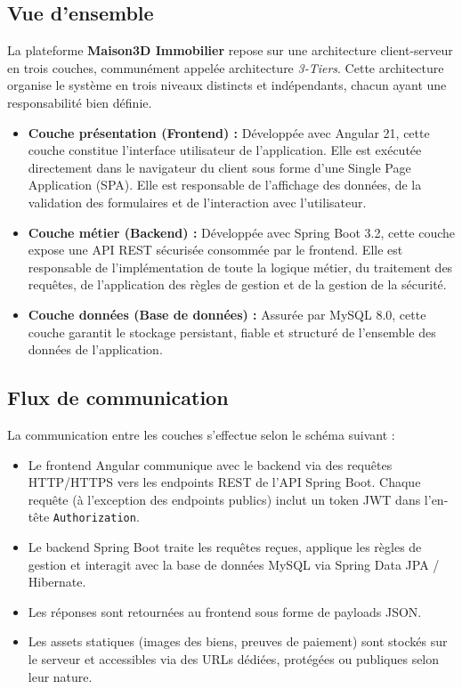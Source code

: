 \documentclass[a4paper,12pt]{report}
\begin{document}
\subsection{Vue d'ensemble}

La plateforme \textbf{Maison3D Immobilier} repose sur une architecture client-serveur en trois couches, communément appelée architecture \textit{3-Tiers}. Cette architecture organise le système en trois niveaux distincts et indépendants, chacun ayant une responsabilité bien définie.

\begin{itemize}
    \item \textbf{Couche présentation (Frontend) :} Développée avec Angular 21, cette couche constitue l'interface utilisateur de l'application. Elle est exécutée directement dans le navigateur du client sous forme d'une Single Page Application (SPA). Elle est responsable de l'affichage des données, de la validation des formulaires et de l'interaction avec l'utilisateur.
    \item \textbf{Couche métier (Backend) :} Développée avec Spring Boot 3.2, cette couche expose une API REST sécurisée consommée par le frontend. Elle est responsable de l'implémentation de toute la logique métier, du traitement des requêtes, de l'application des règles de gestion et de la gestion de la sécurité.
    \item \textbf{Couche données (Base de données) :} Assurée par MySQL 8.0, cette couche garantit le stockage persistant, fiable et structuré de l'ensemble des données de l'application.
\end{itemize}

\subsection{Flux de communication}

La communication entre les couches s'effectue selon le schéma suivant :

\begin{itemize}
    \item Le frontend Angular communique avec le backend via des requêtes HTTP/HTTPS vers les endpoints REST de l'API Spring Boot. Chaque requête (à l'exception des endpoints publics) inclut un token JWT dans l'en-tête \texttt{Authorization}.
    \item Le backend Spring Boot traite les requêtes reçues, applique les règles de gestion et interagit avec la base de données MySQL via Spring Data JPA / Hibernate.
    \item Les réponses sont retournées au frontend sous forme de payloads JSON.
    \item Les assets statiques (images des biens, preuves de paiement) sont stockés sur le serveur et accessibles via des URLs dédiées, protégées ou publiques selon leur nature.
\end{itemize}
\end{document}
